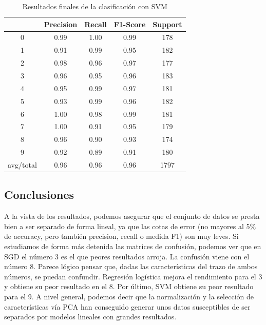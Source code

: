\begin{table}[H]
	\centering
	\begin{tabular}{|c|c|c|c|c|}
		\hline
		& Precision & Recall & F1-Score & Support \\ \hline
		0         & 0.99      & 1.00   & 0.99     & 178     \\ \hline
		1         & 0.91      & 0.99   & 0.95     & 182     \\ \hline
		2         & 0.98      & 0.96   & 0.97     & 177     \\ \hline
		3         & 0.96      & 0.95   & 0.96     & 183     \\ \hline
		4         & 0.95      & 0.99   & 0.97     & 181     \\ \hline
		5         & 0.93      & 0.99   & 0.96     & 182     \\ \hline
		6         & 1.00      & 0.98   & 0.99     & 181     \\ \hline
		7         & 1.00      & 0.91   & 0.95     & 179     \\ \hline
		8         & 0.96      & 0.90   & 0.93     & 174     \\ \hline
		9         & 0.92      & 0.89   & 0.91     & 180     \\ \hline
		avg/total & 0.96      & 0.96   & 0.96     & 1797    \\ \hline
	\end{tabular}
	\caption{Resultados finales de la clasificación con SVM}
\end{table}

\subsection{Conclusiones}

A la vista de los resultados, podemos asegurar que el conjunto de datos se presta bien a ser separado de forma lineal, ya que las cotas de error (no mayores al 5\% de accuracy, pero también precision, recall o medida F1) son muy leves. Si estudiamos de forma más detenida las matrices de confusión, podemos ver que en SGD el número 3 es el que peores resultados arroja. La confusión viene con el número 8. Parece lógico pensar que, dadas las características del trazo de ambos números, se puedan confundir. Regresión logística mejora el rendimiento para el 3 y obtiene su peor resultado en el 8. Por último, SVM obtiene su peor resultado para el 9. A nivel general, podemos decir que la normalización y la selección de características vía PCA han conseguido generar unos datos susceptibles de ser separados por modelos lineales con grandes resultados.

